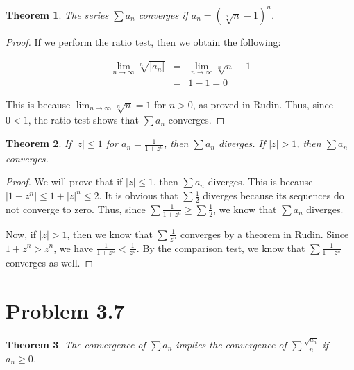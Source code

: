 \documentclass[psamsfonts]{amsart}
\newtheorem{thm}{Theorem}[section]
\theoremstyle{definition}
\theoremstyle{remark}
\numberwithin{equation}{section}
\begin{document}
\begin{thm}
The series $\sum a_n$ converges if $a_n = (\sqrt[n]{n} - 1)^n$. 
\end{thm}

\begin{proof}
If we perform the ratio test, then we obtain the following:

\begin{eqnarray}
\lim_{n \to \infty} \sqrt[n]{|a_n|} &=& \lim_{n \to \infty} \sqrt[n]{n} - 1 \\
&=& 1 - 1 = 0
\end{eqnarray}

This is because $\lim_{n \to \infty} \sqrt[n]{n} = 1$ for $n>0$, as proved in Rudin. Thus, since $0 < 1$, the ratio test shows that $\sum a_n$ converges.
\end{proof}

\begin{thm}
If $|z| \leq 1$ for $a_n = \frac{1}{1+z^n}$, then $\sum a_n$ diverges. If $|z| > 1$, then $\sum a_n$ converges. 
\end{thm}

\begin{proof}
We will prove that if $|z| \leq 1$, then $\sum a_n$ diverges. This is because $|1 + z^n| \leq {1 + |z|^n} \leq {2}$. It is obvious that $\sum \frac{1}{2}$ diverges because its sequences do not converge to zero. Thus, since $\sum \frac{1}{1 + z^n} \geq \sum \frac{1}{2}$, we know that $\sum a_n$ diverges.

Now, if $|z| > 1$, then we know that $\sum \frac{1}{z^n}$ converges by a theorem in Rudin. Since $1 + z^n > z^n$, we have $\frac{1}{1 + z^n} < \frac{1}{z^n}$. By the comparison test, we know that $\sum \frac{1}{1+z^n}$ converges as well. 
\end{proof}

\section{Problem 3.7}

\begin{thm}
The convergence of $\sum a_n$ implies the convergence of $\sum \frac{\sqrt{a_n}}{n}$ if $a_n \geq 0 $.
\end{thm}
\end{document}
